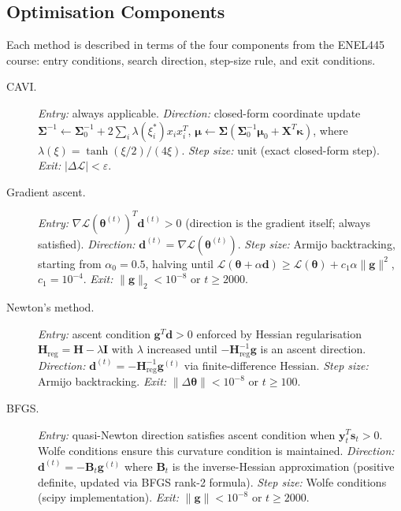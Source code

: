 \documentclass[11pt,a4paper]{article}
\begin{document}
\subsection*{Optimisation Components}

Each method is described in terms of the four components from the ENEL445 course:
entry conditions, search direction, step-size rule, and exit conditions.

\begin{description}
\item[CAVI.]
  \textit{Entry:} always applicable.
  \textit{Direction:} closed-form coordinate update $\bm{\Sigma}^{-1} \leftarrow
  \bm{\Sigma}_0^{-1} + 2\sum_i\lambda(\xi_i^*)x_ix_i^T$,\;
  $\bm{\mu} \leftarrow \bm{\Sigma}(\bm{\Sigma}_0^{-1}\bm{\mu}_0 + \bm{X}^T\bm{\kappa})$,
  where $\lambda(\xi) = \tanh(\xi/2)/(4\xi)$.
  \textit{Step size:} unit (exact closed-form step).
  \textit{Exit:} $|\Delta\mathcal{L}| < \varepsilon$.

\item[Gradient ascent.]
  \textit{Entry:} $\nabla\mathcal{L}(\bm{\theta}^{(t)})^T\bm{d}^{(t)} > 0$ (direction is
  the gradient itself; always satisfied).
  \textit{Direction:} $\bm{d}^{(t)} = \nabla\mathcal{L}(\bm{\theta}^{(t)})$.
  \textit{Step size:} Armijo backtracking, starting from $\alpha_0 = 0.5$, halving until
  $\mathcal{L}(\bm{\theta}+\alpha\bm{d}) \geq \mathcal{L}(\bm{\theta}) + c_1\alpha\|\bm{g}\|^2$,
  $c_1 = 10^{-4}$.
  \textit{Exit:} $\|\bm{g}\|_2 < 10^{-8}$ or $t \geq 2000$.

\item[Newton's method.]
  \textit{Entry:} ascent condition $\bm{g}^T\bm{d} > 0$ enforced by Hessian regularisation
  $\bm{H}_{\mathrm{reg}} = \bm{H} - \lambda\bm{I}$ with $\lambda$ increased until
  $-\bm{H}_{\mathrm{reg}}^{-1}\bm{g}$ is an ascent direction.
  \textit{Direction:} $\bm{d}^{(t)} = -\bm{H}_{\mathrm{reg}}^{-1}\bm{g}^{(t)}$ via finite-difference
  Hessian.
  \textit{Step size:} Armijo backtracking.
  \textit{Exit:} $\|\Delta\bm{\theta}\| < 10^{-8}$ or $t \geq 100$.

\item[BFGS.]
  \textit{Entry:} quasi-Newton direction satisfies ascent condition when $\bm{y}_t^T\bm{s}_t>0$.
  Wolfe conditions ensure this curvature condition is maintained.
  \textit{Direction:} $\bm{d}^{(t)} = -\bm{B}_t \bm{g}^{(t)}$ where $\bm{B}_t$ is the
  inverse-Hessian approximation (positive definite, updated via BFGS rank-2 formula).
  \textit{Step size:} Wolfe conditions (scipy implementation).
  \textit{Exit:} $\|\bm{g}\| < 10^{-8}$ or $t \geq 2000$.
\end{description}
\end{document}

